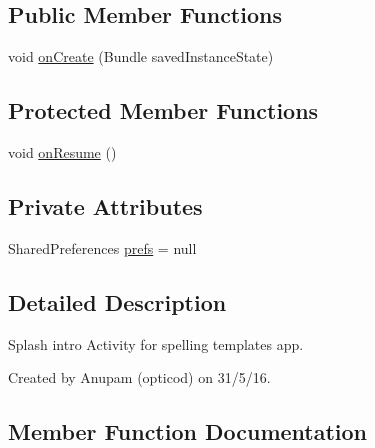 \subsection*{Public Member Functions}
\begin{DoxyCompactItemize}
\item 
void \hyperlink{classorg_1_1buildmlearn_1_1learnspellings_1_1activities_1_1SplashActivity_aab0870736a641087a4fd8d06e9561551}{on\+Create} (Bundle saved\+Instance\+State)
\end{DoxyCompactItemize}
\subsection*{Protected Member Functions}
\begin{DoxyCompactItemize}
\item 
void \hyperlink{classorg_1_1buildmlearn_1_1learnspellings_1_1activities_1_1SplashActivity_a0fbb03f56a634413b579165693c1ed13}{on\+Resume} ()
\end{DoxyCompactItemize}
\subsection*{Private Attributes}
\begin{DoxyCompactItemize}
\item 
Shared\+Preferences \hyperlink{classorg_1_1buildmlearn_1_1learnspellings_1_1activities_1_1SplashActivity_a74e08d6ac31022382aaa45de6ef7f326}{prefs} = null
\end{DoxyCompactItemize}


\subsection{Detailed Description}
Splash intro Activity for spelling template\textquotesingle{}s app. 

Created by Anupam (opticod) on 31/5/16. 

\subsection{Member Function Documentation}
